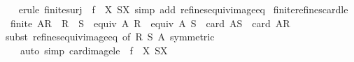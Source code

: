 \begin{isabellebody}
%
\isadelimproof
\ \ %
\endisadelimproof
%
\isatagproof
{}\isamarkupfalse%
\ {\isacharparenleft}{\kern0pt}erule\ finite{\isacharunderscore}{\kern0pt}surj\ {\isacharbrackleft}{\kern0pt}\ f\ {\isacharequal}{\kern0pt}\ {\isachardoublequoteopen}{\isasymlambda}X{\isachardot}{\kern0pt}\ S{\isacharbackquote}{\kern0pt}{\isacharbackquote}{\kern0pt}X{\isachardoublequoteclose}{\isacharbrackright}{\kern0pt}{\isacharparenright}{\kern0pt}\ {\isacharparenleft}{\kern0pt}simp\ add{\isacharcolon}{\kern0pt}\ refines{\isacharunderscore}{\kern0pt}equiv{\isacharunderscore}{\kern0pt}image{\isacharunderscore}{\kern0pt}eq{\isacharparenright}{\kern0pt}%
\endisatagproof
{\isafoldproof}%
%
\isadelimproof
\isanewline
%
\endisadelimproof
\isanewline
{}\isamarkupfalse%
\ finite{\isacharunderscore}{\kern0pt}refines{\isacharunderscore}{\kern0pt}card{\isacharunderscore}{\kern0pt}le{\isacharcolon}{\kern0pt}\isanewline
\ \ {\isachardoublequoteopen}finite\ {\isacharparenleft}{\kern0pt}A{\isacharslash}{\kern0pt}{\isacharslash}{\kern0pt}R{\isacharparenright}{\kern0pt}\ {\isasymLongrightarrow}\ R\ {\isasymsubseteq}\ S\ {\isasymLongrightarrow}\ equiv\ A\ R\ {\isasymLongrightarrow}\ equiv\ A\ S\ {\isasymLongrightarrow}\ card\ {\isacharparenleft}{\kern0pt}A{\isacharslash}{\kern0pt}{\isacharslash}{\kern0pt}S{\isacharparenright}{\kern0pt}\ {\isasymle}\ card\ {\isacharparenleft}{\kern0pt}A{\isacharslash}{\kern0pt}{\isacharslash}{\kern0pt}R{\isacharparenright}{\kern0pt}{\isachardoublequoteclose}\isanewline
%
\isadelimproof
\ \ %
\endisadelimproof
%
\isatagproof
{}\isamarkupfalse%
\ {\isacharparenleft}{\kern0pt}subst\ refines{\isacharunderscore}{\kern0pt}equiv{\isacharunderscore}{\kern0pt}image{\isacharunderscore}{\kern0pt}eq\ {\isacharbrackleft}{\kern0pt}of\ R\ S\ A{\isacharcomma}{\kern0pt}\ symmetric{\isacharbrackright}{\kern0pt}{\isacharparenright}{\kern0pt}\isanewline
\ \ \ \ {\isacharparenleft}{\kern0pt}auto\ simp{\isacharcolon}{\kern0pt}\ card{\isacharunderscore}{\kern0pt}image{\isacharunderscore}{\kern0pt}le\ {\isacharbrackleft}{\kern0pt}\ f\ {\isacharequal}{\kern0pt}\ {\isachardoublequoteopen}{\isasymlambda}X{\isachardot}{\kern0pt}\ S{\isacharbackquote}{\kern0pt}{\isacharbackquote}{\kern0pt}X{\isachardoublequoteclose}{\isacharbrackright}{\kern0pt}{\isacharparenright}{\kern0pt}%
\endisatagproof
{\isafoldproof}%
%
\isadelimproof
%
\endisadelimproof
%
\isadelimdocument
%
\endisadelimdocument
%
\isatagdocument
%
\isamarkuptrue%
%
\endisatagdocument

\end{isabellebody}
